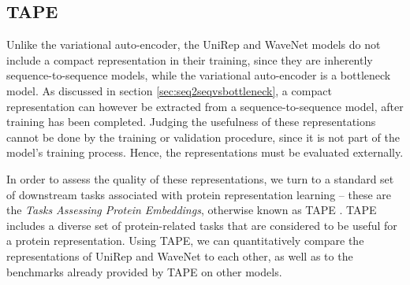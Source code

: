 

\subsection{TAPE}
\label{sec:tape}
Unlike the variational auto-encoder, the UniRep and WaveNet models do not include a compact representation in their training, since they are inherently sequence-to-sequence models, while the variational auto-encoder is a bottleneck model. As discussed in section \ref{sec:seq2seqvsbottleneck}, a compact representation can however be extracted from a sequence-to-sequence model, after training has been completed. Judging the usefulness of these representations cannot be done by the training or validation procedure, since it is not part of the model's training process. Hence, the representations must be evaluated externally.

In order to assess the quality of these representations, we turn to a standard set of downstream tasks associated with protein representation learning -- these are the \textit{Tasks Assessing Protein Embeddings}, otherwise known as TAPE \cite{tape2019}. TAPE includes a diverse set of protein-related tasks that are considered to be useful for a protein representation. Using TAPE, we can quantitatively compare the representations of UniRep and WaveNet to each other, as well as to the benchmarks already provided by TAPE on other models.

